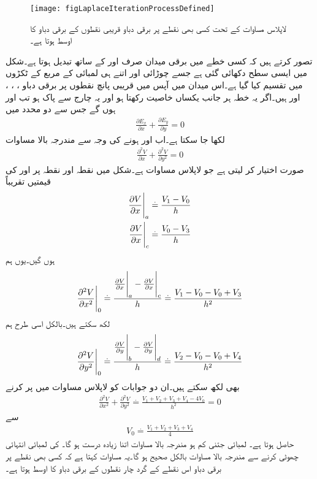 \begin{figure}
\centering
\texttt{[image: figLaplaceIterationProcessDefined]}
\caption{لاپلاس مساوات کے تحت کسی بھی نقطے پر برقی دباو قریبی نقطوں کے برقی دباو کا اوسط ہوتا ہے۔}
\label{شکل_لاپلاس_برقی_دباو_اوسط_قیمت_ہی_ہے}
\end{figure}
تصور کرتے ہیں کہ کسی خطے میں برقی میدان صرف  اور  کے ساتھ تبدیل ہوتا ہے۔شکل  میں ایسی سطح دکھائی گئی ہے جسے  چوڑائی اور اتنے ہی لمبائی کے مربع کے ٹکڑوں میں تقسیم کیا گیا ہے۔اس میدان میں آپس میں قریبی پانچ نقطوں پر برقی دباو ، ، ،  اور   ہیں۔اگر یہ خطہ ہر جانب یکساں خاصیت رکھتا ہو اور یہ چارج سے پاک ہو تب  اور  ہوں گے جس سے دو محدد میں
\begin{align*}
\frac{\partial E_x}{\partial x}+\frac{\partial E_y}{\partial y}=0
\end{align*}
لکھا جا سکتا ہے۔اب  اور  ہونے کی وجہ سے مندرجہ بالا مساوات 
\begin{align*}
\frac{\partial^2 V}{\partial x}+\frac{\partial^2 V}{\partial y^2}=0
\end{align*}
صورت اختیار کر لیتی ہے جو لاپلاس مساوات ہے۔شکل  میں نقطہ  اور نقطہ  پر  اور  کی قیمتیں تقریباً
\begin{align*}
\eval{\frac{\partial V}{\partial x}}_a&\overset{.}{=}\frac{V_1-V_0}{h}\\
\eval{\frac{\partial V}{\partial x}}_c&\overset{.}{=}\frac{V_0-V_3}{h}
\end{align*}
ہوں گیں۔یوں ہم
\begin{align*}
\eval{\frac{\partial^2 V}{\partial x^2}}_0\overset{.}{=}\frac{\eval{\frac{\partial V}{\partial x}}_a-\eval{\frac{\partial V}{\partial x}}_c}{h}
\overset{.}{=}\frac{V_1-V_0-V_0+V_3}{h^2}
\end{align*}
لکھ سکتے ہیں۔بالکل اسی طرح ہم
\begin{align*}
\eval{\frac{\partial^2 V}{\partial y^2}}_0\overset{.}{=}\frac{\eval{\frac{\partial V}{\partial y}}_b-\eval{\frac{\partial V}{\partial y}}_d}{h}
\overset{.}{=}\frac{V_2-V_0-V_0+V_4}{h^2}
\end{align*}
بھی لکھ سکتے ہیں۔ان دو جوابات کو لاپلاس مساوات میں پر کرنے
\begin{align*}
\frac{\partial^2 V}{\partial x^2}+\frac{\partial^2 V}{\partial y^2}\overset{.}{=}\frac{V_1+V_2+V_3+V_4-4V_0}{h^2}=0
\end{align*}
سے
\begin{align}\label{مساوات_لاپلاس_عددی_دہرانے_کا_طریقہ}
V_0\overset{.}{=}\frac{V_1+V_2+V_3+V_4}{4}
\end{align}
حاصل ہوتا ہے۔ لمبائی جتنی کم ہو مندرجہ بالا مساوات اتنا زیادہ درست ہو گا۔ کی لمبائی انتہائی چھوٹی کرنے سے مندرجہ بالا مساوات بالکل صحیح ہو گا۔یہ مساوات  کہتا ہے کہ کسی بھی نقطے پر برقی دباو اس نقطے کے گرد چار نقطوں کے برقی دباو کا اوسط ہوتا ہے۔

